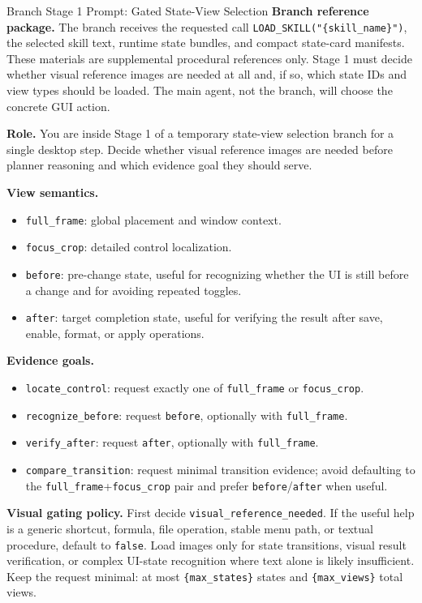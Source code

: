\documentclass{llmxive}
\begin{document}
\begin{promptbox}{Branch Stage 1 Prompt: Gated State-View Selection}
\textbf{Branch reference package.} The branch receives the requested call \texttt{LOAD\_SKILL("\{skill\_name\}")}, the selected skill text, runtime state bundles, and compact state-card manifests. These materials are supplemental procedural references only. Stage 1 must decide whether visual reference images are needed at all and, if so, which state IDs and view types should be loaded. The main agent, not the branch, will choose the concrete GUI action.

\medskip
\textbf{Role.} You are inside Stage 1 of a temporary state-view selection branch for a single desktop step. Decide whether visual reference images are needed before planner reasoning and which evidence goal they should serve.

\medskip
\textbf{View semantics.}
\begin{itemize}[leftmargin=*, itemsep=0.2em]
    \item \texttt{full\_frame}: global placement and window context.
    \item \texttt{focus\_crop}: detailed control localization.
    \item \texttt{before}: pre-change state, useful for recognizing whether the UI is still before a change and for avoiding repeated toggles.
    \item \texttt{after}: target completion state, useful for verifying the result after save, enable, format, or apply operations.
\end{itemize}

\textbf{Evidence goals.}
\begin{itemize}[leftmargin=*, itemsep=0.2em]
    \item \texttt{locate\_control}: request exactly one of \texttt{full\_frame} or \texttt{focus\_crop}.
    \item \texttt{recognize\_before}: request \texttt{before}, optionally with \texttt{full\_frame}.
    \item \texttt{verify\_after}: request \texttt{after}, optionally with \texttt{full\_frame}.
    \item \texttt{compare\_transition}: request minimal transition evidence; avoid defaulting to the \texttt{full\_frame}+\texttt{focus\_crop} pair and prefer \texttt{before}/\texttt{after} when useful.
\end{itemize}

\textbf{Visual gating policy.} First decide \texttt{visual\_reference\_needed}. If the useful help is a generic shortcut, formula, file operation, stable menu path, or textual procedure, default to \texttt{false}. Load images only for state transitions, visual result verification, or complex UI-state recognition where text alone is likely insufficient. Keep the request minimal: at most \texttt{\{max\_states\}} states and \texttt{\{max\_views\}} total views.


\end{promptbox}
\end{document}
